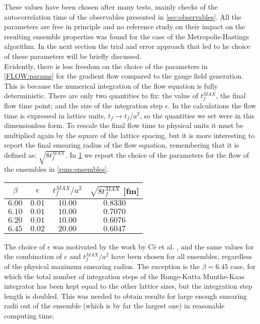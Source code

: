 These values have been chosen after many tests, mainly checks of the autocorrelation time of the observables presented in \cref{sec:observables}. All the parameters are free in principle and no reference study on their impact on the resulting ensemble properties was found for the case of the Metropolis-Hastings algorithm. In the next section the trial and error approach that led to he choice of these parameters will be briefly discussed.\\
Evidently, there is less freedom on the choice of the parameters in \cref{FLOW:params} for the gradient flow compared to the gauge field generation. This is because the numerical integration of the flow equation is fully deterministic. There are only two quantities to fix: the value of $t_f^{MAX}$, the final flow time point; and the size of the integration step $\epsilon$. In the calculations the flow time is expressed in lattice units, $t_f \rightarrow t_f/a^2$, so the quantities we set were in this dimensionless form. To rescale the final flow time to physical units it must be multiplied again by the square of the lattice spacing, but it is more interesting to report the final smearing radius of the flow equation, remembering that it is defined as: $\sqrt{8t_f^{MAX}}$. In \cref{runs:flow} we report the choice of the parameters for the flow of the ensembles in \cref{runs:ensembles}.
 
\begin{table}[!htb]
    \begin{center}
    \begin{tabular}{cccc} 
        $\beta$ & $\epsilon$ & $t_f^{MAX}/a^2$ & $\sqrt{8t_f^{MAX}}$ [fm] \\\hline
        $6.00$ & $0.01$ & $10.00$ & $0.8330$ \\
        $6.10$ & $0.01$ & $10.00$ & $0.7070$ \\
        $6.20$ & $0.01$ & $10.00$ & $0.6076$ \\
        $6.45$ & $0.02$ & $20.00$ & $0.6047$ 
    \end{tabular}
    \label{runs:flow} 
    \end{center}
\end{table}
The choice of $\epsilon$ was motivated by the work by C\`{e} et al. \cite{ce_testing_2015}, and the same values for the combination of $\epsilon$ and $t_f^{MAX}/a^2$ have been chosen for all ensembles, regardless of the physical maximum smearing radius. The exception is the $\beta=6.45$ case, for which the total number of integration steps of the Runge-Kutta Munthe-Kaas integrator has been kept equal to the other lattice sizes, but the integration step length is doubled. This was needed to obtain results for large enough smearing radii out of the ensemble (which is by far the largest one) in reasonable computing time.


